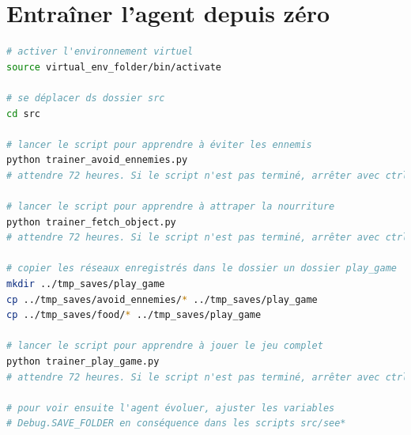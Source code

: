 \documentclass[11pt,a4paper]{report}
\begin{document}
\section{Entraîner l'agent depuis zéro}
\begin{lstlisting}[language=bash]
# activer l'environnement virtuel
source virtual_env_folder/bin/activate

# se déplacer ds dossier src
cd src 

# lancer le script pour apprendre à éviter les ennemis
python trainer_avoid_ennemies.py
# attendre 72 heures. Si le script n'est pas terminé, arrêter avec ctrl+c

# lancer le script pour apprendre à attraper la nourriture
python trainer_fetch_object.py
# attendre 72 heures. Si le script n'est pas terminé, arrêter avec ctrl+c

# copier les réseaux enregistrés dans le dossier un dossier play_game
mkdir ../tmp_saves/play_game
cp ../tmp_saves/avoid_ennemies/* ../tmp_saves/play_game
cp ../tmp_saves/food/* ../tmp_saves/play_game

# lancer le script pour apprendre à jouer le jeu complet
python trainer_play_game.py
# attendre 72 heures. Si le script n'est pas terminé, arrêter avec ctrl+c

# pour voir ensuite l'agent évoluer, ajuster les variables 
# Debug.SAVE_FOLDER en conséquence dans les scripts src/see*

  \end{lstlisting}  
\end{document}
